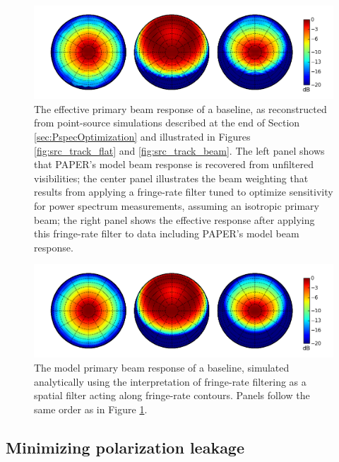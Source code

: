 \documentclass[twocolumn,apj,numberedappendix]{emulateapj}
\begin{document}
\begin{figure}\centering
\includegraphics[width=1.9\columnwidth]{plots/eff_beam.png}
\caption{
The effective primary beam response of a baseline, as reconstructed from point-source simulations 
described at the end of Section \ref{sec:PspecOptimization} and illustrated in Figures \ref{fig:src_track_flat} and
\ref{fig:src_track_beam}. 
The left panel shows that PAPER's model beam response is recovered from unfiltered
visibilities; the center panel illustrates the
beam weighting that results from applying a fringe-rate filter tuned to optimize sensitivity
for power spectrum measurements, assuming an isotropic primary beam; the right panel
shows the effective response after applying this fringe-rate filter to data including PAPER's model beam response.
}\label{fig:eff_beam}
\end{figure}

\begin{figure}\centering
\includegraphics[width=1.9\columnwidth]{plots/sim_beam.png}
\caption{
The model primary beam response of a baseline, simulated analytically using the interpretation
of fringe-rate filtering as a spatial filter acting along fringe-rate contours.  Panels follow
the same order as in Figure \ref{fig:eff_beam}.
}\label{fig:sim_beam}
\end{figure}

\subsection{Minimizing polarization leakage}
\label{sec:polbeams}
\def\VXX{{V_{\rm XX}}}
\def\VYY{{V_{\rm YY}}}
\def\VI{{V_{\rm I}}}
\def\VQ{{V_{\rm Q}}}
\end{document}
